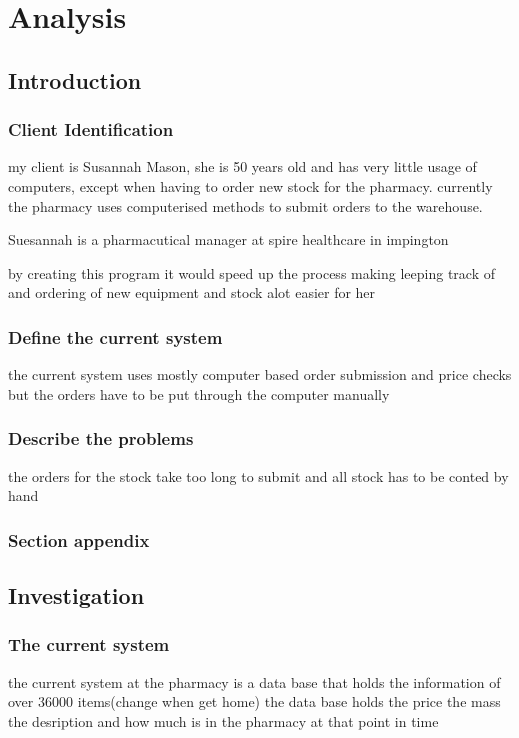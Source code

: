 \chapter{Analysis}

\section{Introduction}

\subsection{Client Identification}
my client is Susannah Mason, she is 50 years old and has very little usage of computers, except when having to order new stock for the pharmacy. currently the pharmacy uses computerised methods to submit orders to the warehouse.

Suesannah is a pharmacutical manager at spire healthcare in impington 

by  creating this program it would speed up the process making leeping track of and ordering of new equipment and stock alot easier for her 
\subsection{Define the current system}
 the current system uses mostly computer based order submission and price checks but the orders have to be put through the computer manually 
\subsection{Describe the problems}
the orders for the stock take too long to submit and all stock has to be conted by hand 
\subsection{Section appendix}

\section{Investigation}

\subsection{The current system}
the current system at the pharmacy is a data base that holds the information of over 36000 items(change when get home) the data base holds the price the mass the desription and how much is in the pharmacy at that point in time
